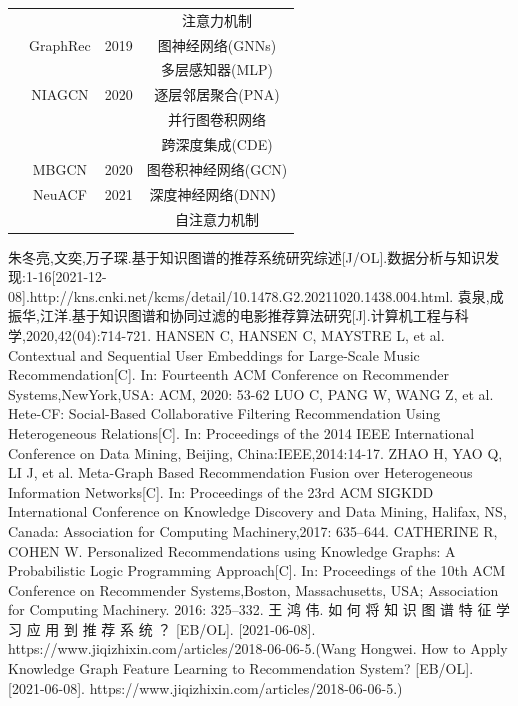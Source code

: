 \documentclass{article}
\begin{document}
{\begin{table}[H]
\begin{tabular}{cccc}
			&  &  & 注意力机制 \\
			& GraphRec & 2019 & 图神经网络(GNNs) \\
			&  &  & 多层感知器(MLP) \\
			& NIAGCN & 2020 & 逐层邻居聚合(PNA) \\
			&  &  & 并行图卷积网络 \\
			&  &  & 跨深度集成(CDE) \\
			& MBGCN & 2020 & 图卷积神经网络(GCN) \\
			& NeuACF & 2021 & 深度神经网络(DNN） \\
			&  &  & 自注意力机制 \\ \hline
		\end{tabular}
	\end{table}
	
\begin{thebibliography}{9}%
	  朱冬亮,文奕,万子琛.基于知识图谱的推荐系统研究综述[J/OL].数据分析与知识发现:1-16[2021-12-08].http://kns.cnki.net/kcms/detail/10.1478.G2.20211020.1438.004.html.
	 袁泉,成振华,江洋.基于知识图谱和协同过滤的电影推荐算法研究[J].计算机工程与科学,2020,42(04):714-721.
	HANSEN C, HANSEN C, MAYSTRE L, et al. Contextual and Sequential User Embeddings for Large-Scale
	Music Recommendation[C]. In: Fourteenth ACM Conference on Recommender Systems,NewYork,USA: ACM,
	2020: 53-62
	LUO C, PANG W, WANG Z, et al. Hete-CF: Social-Based Collaborative Filtering Recommendation Using
	Heterogeneous Relations[C]. In: Proceedings of the 2014 IEEE International Conference on Data Mining, Beijing,
	China:IEEE,2014:14-17.
	ZHAO H, YAO Q, LI J, et al. Meta-Graph Based Recommendation Fusion over Heterogeneous Information
	Networks[C]. In: Proceedings of the 23rd ACM SIGKDD International Conference on Knowledge Discovery and
	Data Mining, Halifax, NS, Canada: Association for Computing Machinery,2017: 635–644.
	CATHERINE R, COHEN W. Personalized Recommendations using Knowledge Graphs: A Probabilistic Logic
	Programming Approach[C]. In: Proceedings of the 10th ACM Conference on Recommender Systems,Boston,
	Massachusetts, USA; Association for Computing Machinery. 2016: 325–332.	
	王 鸿 伟. 如 何 将 知 识 图 谱 特 征 学 习 应 用 到 推 荐 系 统 ？ [EB/OL]. [2021-06-08].
	https://www.jiqizhixin.com/articles/2018-06-06-5.(Wang Hongwei. How to Apply Knowledge Graph Feature
	Learning to Recommendation System? [EB/OL]. [2021-06-08]. https://www.jiqizhixin.com/articles/2018-06-06-5.)
	

\end{thebibliography}}
\end{document}
